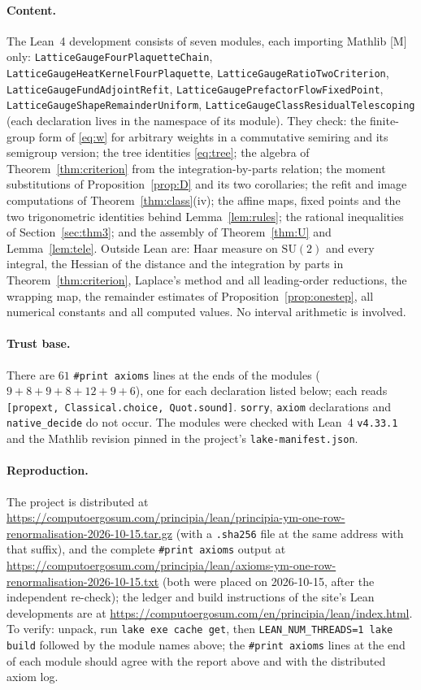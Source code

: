 \documentclass[11pt,a4paper]{article}
\theoremstyle{definition}
\theoremstyle{remark}
\newcommand{\SU}{\mathrm{SU}(2)}
\newcommand{\code}[1]{\texttt{#1}}
\newcommand{\bundleurl}{https://computoergosum.com/principia/lean/principia-ym-one-row-renormalisation-2026-10-15.tar.gz}
\newcommand{\axiomsurl}{https://computoergosum.com/principia/lean/axioms-ym-one-row-renormalisation-2026-10-15.txt}
\begin{document}
\paragraph{Content.}
The Lean~4 development consists of seven modules, each importing Mathlib [M] only: \code{LatticeGaugeFourPlaquetteChain}, \code{LatticeGaugeHeatKernelFourPlaquette}, \code{LatticeGaugeRatioTwoCriterion}, \code{LatticeGaugeFundAdjointRefit}, \code{LatticeGaugePrefactorFlowFixedPoint}, \code{LatticeGaugeShapeRemainderUniform}, \code{LatticeGaugeClassResidualTelescoping} (each declaration lives in the namespace of its module).
They check: the finite-group form of \eqref{eq:w} for arbitrary weights in a commutative semiring and its semigroup version; the tree identities \eqref{eq:tree}; the algebra of Theorem~\ref{thm:criterion} from the integration-by-parts relation; the moment substitutions of Proposition~\ref{prop:D} and its two corollaries; the refit and image computations of Theorem~\ref{thm:class}(iv); the affine maps, fixed points and the two trigonometric identities behind Lemma~\ref{lem:rules}; the rational inequalities of Section~\ref{sec:thm3}; and the assembly of Theorem~\ref{thm:U} and Lemma~\ref{lem:tele}.
Outside Lean are: Haar measure on $\SU$ and every integral, the Hessian of the distance and the integration by parts in Theorem~\ref{thm:criterion}, Laplace's method and all leading-order reductions, the wrapping map, the remainder estimates of Proposition~\ref{prop:onestep}, all numerical constants and all computed values.
No interval arithmetic is involved.

\paragraph{Trust base.}
There are $61$ \code{\#print axioms} lines at the ends of the modules ($9+8+9+8+12+9+6$), one for each declaration listed below; each reads \code{[propext, Classical.choice, Quot.sound]}.
\code{sorry}, \code{axiom} declarations and \code{native\_decide} do not occur.
The modules were checked with Lean~4 \code{v4.33.1} and the Mathlib revision pinned in the project's \code{lake-\allowbreak{}manifest.json}.

\paragraph{Reproduction.}
The project is distributed at \url{\bundleurl} (with a \code{.sha256} file at the same address with that suffix), and the complete \code{\#print axioms} output at \url{\axiomsurl} (both were placed on 2026-10-15, after the independent re-check); the ledger and build instructions of the site's Lean developments are at \url{https://computoergosum.com/en/principia/lean/index.html}.
To verify: unpack, run \code{lake exe cache get}, then \code{LEAN\_NUM\_THREADS=1 lake build} followed by the module names above; the \code{\#print axioms} lines at the end of each module should agree with the report above and with the distributed axiom log.
\end{document}
